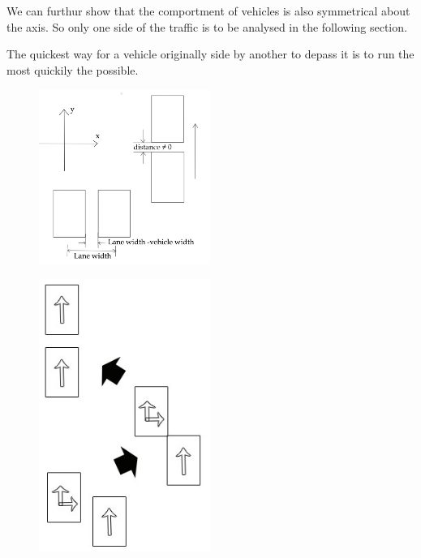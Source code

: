 \documentclass{mcmthesis}
\begin{document}
We can furthur show that the comportment of vehicles is also symmetrical about the axis. So only one side of the traffic is to be analysed in the following section.

\begin{Theorem} \label{thm:yingsongsheng2}
The quickest way for a vehicle originally side by another to depass it is to run the most quickily the possible.
\end{Theorem}

\begin{figure}[h]
	\begin{minipage}[h]{0.5\linewidth}
		\centering
		\includegraphics[width=2.2in]{Attachment-1.jpg}
		\label{symmetrical}
	\end{minipage}%
	\begin{minipage}[h]{0.5\linewidth}
		\centering
		\includegraphics[width=2.2in]{D.jpg}
		\label{asymmetrical}
	\end{minipage}
\end{figure}
\end{document}
